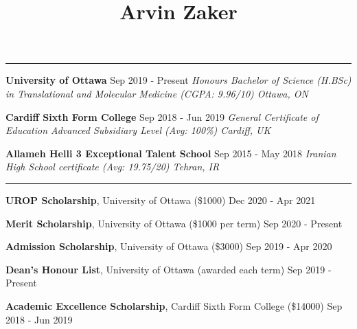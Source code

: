 \title{\vspace{-3em}\textbf{Arvin Zaker}\vspace{-4em}}
\maketitle


\vspace{1em}

 \vspace{-1em} \noindent

\rule{18cm}{0.5pt}

\textbf{University of Ottawa} \hfill Sep 2019 - Present \linebreak
\emph{Honours Bachelor of Science (H.BSc) in Translational and Molecular
Medicine (CGPA: 9.96/10) \hfill Ottawa, ON}

\textbf{Cardiff Sixth Form College} \hfill Sep 2018 - Jun 2019
\linebreak \emph{General Certificate of Education Advanced Subsidiary
Level (Avg: 100\%) \hfill Cardiff, UK}

\textbf{Allameh Helli 3 Exceptional Talent School} \hfill Sep 2015 - May
2018 \linebreak \emph{Iranian High School certificate (Avg: 19.75/20)
\hfill Tehran, IR}

\vspace{1em}

 \vspace{-1em}
\noindent

\rule{18cm}{0.5pt}

\textbf{UROP Scholarship}, University of Ottawa (\$1000) \hfill Dec 2020
- Apr 2021

\textbf{Merit Scholarship}, University of Ottawa (\$1000 per term)
\hfill Sep 2020 - Present

\textbf{Admission Scholarship}, University of Ottawa (\$3000) \hfill Sep
2019 - Apr 2020

\textbf{Dean's Honour List}, University of Ottawa (awarded each term)
\hfill Sep 2019 - Present

\textbf{Academic Excellence Scholarship}, Cardiff Sixth Form College
(\$14000) \hfill Sep 2018 - Jun 2019

\vspace{1em}

